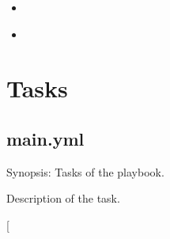 \documentclass[letterpaper,10pt,english]{sphinxmanual}
\begin{document}
\begin{sphinxShadowBox}
\begin{itemize}
\begin{itemize}
\begin{itemize}
\item {} 
\label{\detokenize{annotation:id117}}{\hyperref[\detokenize{annotation:zeitgeist-yml}]{}}

\item {} 
\label{\detokenize{annotation:id118}}{\hyperref[\detokenize{annotation:zfs-yml}]{}}

\end{itemize}

\end{itemize}

\end{itemize}
\end{sphinxShadowBox}


\section{Tasks}
\label{\detokenize{annotation:tasks}}\label{\detokenize{annotation:as-tree}}

\subsection{main.yml}
\label{\detokenize{annotation:main-yml}}\label{\detokenize{annotation:as-main-yml}}
Synopsis: Tasks of the playbook.

Description of the task.

{[}\sphinxhref{https://github.com/vbotka/ansible-linux-postinstall/blob/master/tasks/main.yml}{main.yml}{]}
\end{document}
